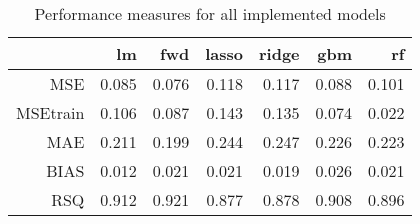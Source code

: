 \begin{table}[ht]
\centering
\begin{tabular}{rrrrrrr}
  \hline
 & lm & fwd & lasso & ridge & gbm & rf \\ 
  \hline
MSE & 0.085 & 0.076 & 0.118 & 0.117 & 0.088 & 0.101 \\ 
  MSEtrain & 0.106 & 0.087 & 0.143 & 0.135 & 0.074 & 0.022 \\ 
  MAE & 0.211 & 0.199 & 0.244 & 0.247 & 0.226 & 0.223 \\ 
  BIAS & 0.012 & 0.021 & 0.021 & 0.019 & 0.026 & 0.021 \\ 
  RSQ & 0.912 & 0.921 & 0.877 & 0.878 & 0.908 & 0.896 \\ 
   \hline
\end{tabular}
\caption{Performance measures for all implemented models} 
\label{tab:measures}
\end{table}
